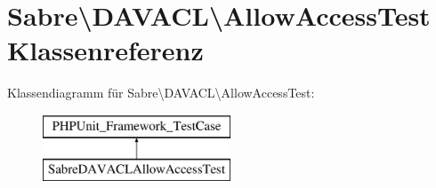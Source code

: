 \hypertarget{class_sabre_1_1_d_a_v_a_c_l_1_1_allow_access_test}{}\section{Sabre\textbackslash{}D\+A\+V\+A\+CL\textbackslash{}Allow\+Access\+Test Klassenreferenz}
\label{class_sabre_1_1_d_a_v_a_c_l_1_1_allow_access_test}
Klassendiagramm für Sabre\textbackslash{}D\+A\+V\+A\+CL\textbackslash{}Allow\+Access\+Test\+:\begin{figure}[H]
\begin{center}
\leavevmode
\includegraphics[height=2.000000cm]{class_sabre_1_1_d_a_v_a_c_l_1_1_allow_access_test}
\end{center}
\end{figure}
